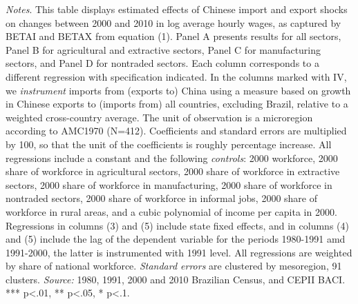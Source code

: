 \begin{center}
\begin{table}[h!]
\emph{Notes}. This table displays estimated effects of Chinese import and export shocks on changes between 2000 and 2010 in log average hourly wages, as captured by BETAI and BETAX from equation (1). Panel A presents results for all sectors, Panel B for agricultural and extractive sectors, Panel C for manufacturing sectors, and Panel D for nontraded sectors. Each column corresponds to a different regression with specification indicated. In the columns marked with IV, we \emph{instrument} imports from (exports to) China using a measure based on growth in Chinese exports to (imports from) all countries, excluding Brazil, relative to a weighted cross-country average. The unit of observation is a microregion according to AMC1970 (N=412). Coefficients and standard errors are multiplied by 100, so that the unit of the coefficients is roughly percentage increase. All regressions include a constant and the following \emph{controls}: 2000 workforce, 2000 share of workforce in agricultural sectors, 2000 share of workforce in extractive sectors, 2000 share of workforce in manufacturing, 2000 share of workforce in nontraded sectors, 2000 share of workforce in informal jobs, 2000 share of workforce in rural areas, and a cubic polynomial of income per capita in 2000. Regressions in columns (3) and (5) include state fixed effects, and in columns (4) and (5) include the lag of the dependent variable for the periods 1980-1991 amd 1991-2000, the latter is instrumented with 1991 level. All regressions are weighted by share of national workforce.
 \emph{Standard errors} are clustered by mesoregion, 91 clusters. \emph{Source:} 1980, 1991, 2000 and 2010 Brazilian Census, and CEPII BACI. *** p<.01, ** p<.05, * p<.1.
\end{table}
\par \end{center}
